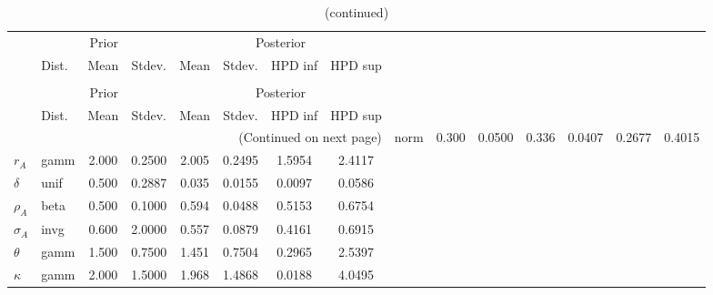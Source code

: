  
\begin{center}
\begin{longtable}{llcccccc} 
\caption{Results from Metropolis-Hastings (parameters)}
 \label{Table:MHPosterior:1}\\
\toprule 
  & \multicolumn{3}{c}{Prior}  &  \multicolumn{4}{c}{Posterior} \\
  \cmidrule(r{.75em}){2-4} \cmidrule(r{.75em}){5-8}
  & Dist. & Mean  & Stdev. & Mean & Stdev. & HPD inf & HPD sup\\
\midrule \endfirsthead 
\caption{(continued)}\\\toprule 
  & \multicolumn{3}{c}{Prior}  &  \multicolumn{4}{c}{Posterior} \\
  \cmidrule(r{.75em}){2-4} \cmidrule(r{.75em}){5-8}
  & Dist. & Mean  & Stdev. & Mean & Stdev. & HPD inf & HPD sup\\
\midrule \endhead 
\bottomrule \multicolumn{8}{r}{(Continued on next page)} \endfoot 
\bottomrule \endlastfoot 
${\alpha}$ & norm &   0.300 & 0.0500 &   0.336& 0.0407 &  0.2677 &  0.4015 \\ 
${r_{A}}$ & gamm &   2.000 & 0.2500 &   2.005& 0.2495 &  1.5954 &  2.4117 \\ 
${\delta}$ & unif &   0.500 & 0.2887 &   0.035& 0.0155 &  0.0097 &  0.0586 \\ 
${\rho_A}$ & beta &   0.500 & 0.1000 &   0.594& 0.0488 &  0.5153 &  0.6754 \\ 
${\sigma_A}$ & invg &   0.600 & 2.0000 &   0.557& 0.0879 &  0.4161 &  0.6915 \\ 
${\theta}$ & gamm &   1.500 & 0.7500 &   1.451& 0.7504 &  0.2965 &  2.5397 \\ 
${\kappa}$ & gamm &   2.000 & 1.5000 &   1.968& 1.4868 &  0.0188 &  4.0495 \\ 
\end{longtable}
 \end{center}
